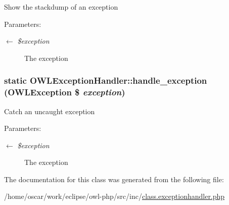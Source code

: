 Show the stackdump of an exception \begin{Desc}
\item[Parameters:]
\begin{description}
\item[\mbox{$\leftarrow$} {\em \$exception}]The exception \end{description}
\end{Desc}
\hypertarget{classOWLExceptionHandler_9d10d18ec1d1eb31b5d8ef2a0f288402}{
\subsubsection{\setlength{\rightskip}{0pt plus 5cm}static OWLExceptionHandler::handle\_\-exception ({\bf OWLException} \$ {\em exception})}}
\label{classOWLExceptionHandler_9d10d18ec1d1eb31b5d8ef2a0f288402}


Catch an uncaught exception \begin{Desc}
\item[Parameters:]
\begin{description}
\item[\mbox{$\leftarrow$} {\em \$exception}]The exception \end{description}
\end{Desc}


The documentation for this class was generated from the following file:\begin{CompactItemize}
\item 
/home/oscar/work/eclipse/owl-php/src/inc/\hyperlink{class_8exceptionhandler_8php}{class.exceptionhandler.php}\end{CompactItemize}
